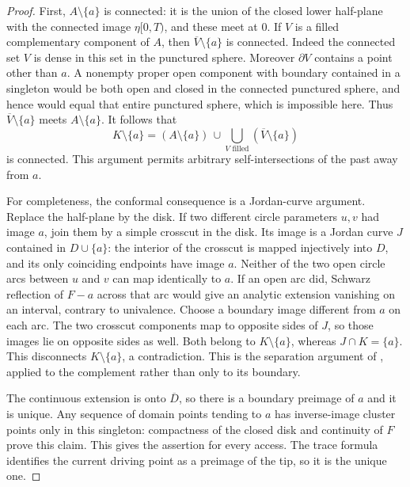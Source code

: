 \documentclass[11pt]{article}
\theoremstyle{definition}
\theoremstyle{remark}
\numberwithin{equation}{section}
\begin{document}
\begin{proof}
First, $A\setminus\{a\}$ is connected: it is the union of the closed
lower half-plane with the connected image $\eta[0,T)$, and these meet
at $0$.  If $V$ is a filled complementary component of $A$, then
$\overline V\setminus\{a\}$ is connected.  Indeed the connected set
$V$ is dense in this set in the punctured sphere.  Moreover
$\partial V$ contains a point other than $a$.  A nonempty proper open
component with boundary contained in a singleton would be both open
and closed in the connected punctured sphere, and hence would equal
that entire punctured sphere, which is impossible here.  Thus
$\overline V\setminus\{a\}$ meets $A\setminus\{a\}$.  It follows
that
\[
 K\setminus\{a\}
  =(A\setminus\{a\})\,
    \cup\!\bigcup_{V\text{ filled}}
          (\overline V\setminus\{a\})
\]
is connected.  This argument permits arbitrary self-intersections of the
past away from $a$.

For completeness, the conformal consequence is a Jordan-curve
argument.  Replace the half-plane by the disk.  If two different circle
parameters $u,v$ had image $a$, join them by a simple crosscut in the
disk.  Its image is a Jordan curve $J$ contained in $D\cup\{a\}$:
the interior of the crosscut is mapped injectively into $D$, and its
only coinciding endpoints have image $a$.  Neither of the two open
circle arcs between $u$ and $v$ can map identically to $a$.  If an open
arc did, Schwarz reflection of $F-a$ across that arc would give an
analytic extension vanishing on an interval, contrary to univalence.
Choose a boundary image different from $a$ on each arc.  The two
crosscut components map to opposite sides of $J$, so those images lie
on opposite sides as well.  Both belong to $K\setminus\{a\}$,
whereas $J\cap K=\{a\}$.  This disconnects $K\setminus\{a\}$,
a contradiction.  This is the separation argument of
\cite[proof of Theorem~1, pp.~426--427, equations~(2.2)--(2.3)]{pommerenke1985},
applied to the complement rather than only to its boundary.

The continuous extension is onto $\overline D$, so there is a boundary
preimage of $a$ and it is unique.  Any sequence of domain points tending
to $a$ has inverse-image cluster points only in this singleton:
compactness of the closed disk and continuity of $F$ prove this claim.
This gives the assertion for every access.  The trace formula identifies
the current driving point as a preimage of the tip, so it is the unique
one.
\end{proof}
\end{document}
